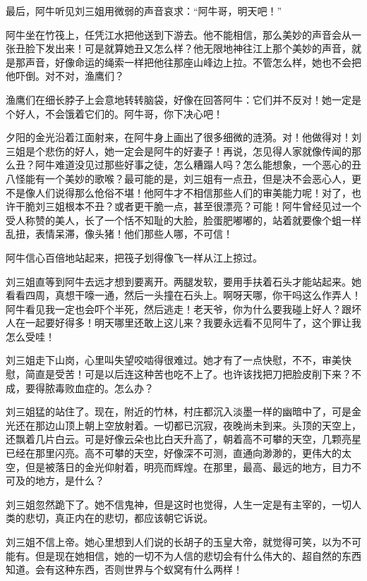  最后，阿牛听见刘三姐用微弱的声音哀求：“阿牛哥，明天吧！” 
 
 阿牛坐在竹筏上，任凭江水把他送到下游去。他不能相信，那么美妙的声音会从一张丑脸下发出来！可是就算她丑又怎么样？他无限地神往江上那个美妙的声音，就是那声音，好像命运的绳索一样把他往那座山峰边上拉。不管怎么样，她也不会把他吓倒。对不对，渔鹰们？ 
 
 渔鹰们在细长脖子上会意地转转脑袋，好像在回答阿牛：它们并不反对！她一定是个好人，不会饿着它们的。阿牛哥，你下决心吧！ 
 
 夕阳的金光沿着江面射来，在阿牛身上画出了很多细微的涟漪。对！他做得对！刘三姐是个悲伤的好人，她一定会是阿牛的好妻子！再说，怎见得人家就像传闻的那么丑？阿牛难道没见过那些好事之徒，怎么糟蹋人吗？怎么能想象，一个恶心的丑八怪能有一个美妙的歌喉？最可能的是，刘三姐有一点丑，但是决不会恶心人，更不是像人们说得那么伧俗不堪！他阿牛才不相信那些人们的审美能力呢！对了，也许干脆刘三姐根本不丑？或者更干脆一点，甚至很漂亮？可能！阿牛曾经见过一个受人称赞的美人，长了一个恬不知耻的大脸，脸蛋肥嘟嘟的，站着就要像个蛆一样乱扭，表情呆滞，像头猪！他们那些人哪，不可信！ 
 
 阿牛信心百倍地站起来，把筏子划得像飞一样从江上掠过。 
 
 刘三姐直等到阿牛去远才想到要离开。两腿发软，要用手扶着石头才能站起来。她看看四周，真想干嚎一通，然后一头撞在石头上。啊呀天哪，你干吗这么作弄人！阿牛看见我一定也会吓个半死，然后逃走！老天爷，你为什么要我碰上好人？跟坏人在一起要好得多！明天哪里还敢上这儿来？我要永远看不见阿牛了，这个罪让我怎么受哇！ 
 
 刘三姐走下山岗，心里叫失望咬啮得很难过。她才有了一点快慰，不不，审美快慰，简直是受苦！可是以后连这种苦也吃不上了。也许该找把刀把脸皮削下来？不成，要得脓毒败血症的。怎么办？ 
 
 刘三姐猛的站住了。现在，附近的竹林，村庄都沉入淡墨一样的幽暗中了，可是金光还在那边山顶上朝上空放射着。一切都已沉寂，夜晚尚未到来。头顶的天空上，还飘着几片白云。可是好像云朵也比白天升高了，朝着高不可攀的天空，几颗亮星已经在那里闪亮。高不可攀的天空，好像深不可测，直通向渺渺的，更伟大的太空，但是被落日的金光仰射着，明亮而辉煌。在那里，最高、最远的地方，目力不可及的地方，是什么？ 
 
 刘三姐忽然跪下了。她不信鬼神，但是这时也觉得，人生一定是有主宰的，一切人类的悲切，真正内在的悲切，都应该朝它诉说。 
 
 刘三姐不信上帝。她心里想到人们说的长胡子的玉皇大帝，就觉得可笑，以为不可能有。但是现在她相信，她的一切不为人信的悲切会有什么伟大的、超自然的东西知道。会有这种东西，否则世界与个蚁窝有什么两样！ 
 
